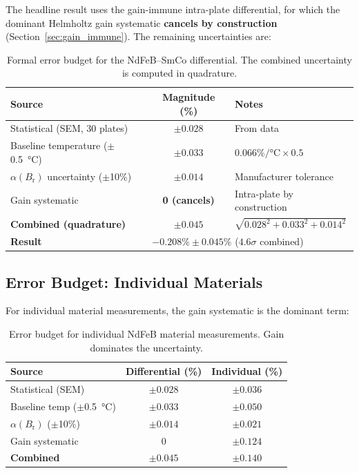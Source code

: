 \documentclass[11pt,letterpaper]{article}
\newcommand{\Br}{B_\mathrm{r}}
\newcommand{\alphar}{\alpha(\Br)}
\begin{document}
The headline result uses the gain-immune intra-plate differential, for which
the dominant Helmholtz gain systematic \textbf{cancels by construction}
(Section~\ref{sec:gain_immune}). The remaining uncertainties are:

\begin{table}[H]
\centering
\caption{Formal error budget for the NdFeB--SmCo differential. The combined
uncertainty is computed in quadrature.}
\label{tab:error_budget}
\begin{tabular}{@{}lcl@{}}
\toprule
\textbf{Source} & \textbf{Magnitude (\%)} & \textbf{Notes} \\
\midrule
Statistical (SEM, 30 plates) & $\pm 0.028$ & From data \\
Baseline temperature ($\pm$\SI{0.5}{\celsius}) & $\pm 0.033$ & $0.066\%/\si{\celsius} \times 0.5$ \\
$\alphar$ uncertainty ($\pm$10\%) & $\pm 0.014$ & Manufacturer tolerance \\
Gain systematic & \textbf{0 (cancels)} & Intra-plate by construction \\
\midrule
\textbf{Combined (quadrature)} & $\pm 0.045$ & $\sqrt{0.028^2 + 0.033^2 + 0.014^2}$ \\
\midrule\midrule
\textbf{Result} & \multicolumn{2}{l}{$\mathbf{-0.208\% \pm 0.045\%}$ ($4.6\sigma$ combined)} \\
\bottomrule
\end{tabular}
\end{table}

\subsection{Error Budget: Individual Materials}

For individual material measurements, the gain systematic is the dominant term:

\begin{table}[H]
\centering
\caption{Error budget for individual NdFeB material measurements. Gain
dominates the uncertainty.}
\label{tab:error_budget_individual}
\begin{tabular}{@{}lcc@{}}
\toprule
\textbf{Source} & \textbf{Differential (\%)} & \textbf{Individual (\%)} \\
\midrule
Statistical (SEM) & $\pm 0.028$ & $\pm 0.036$ \\
Baseline temp ($\pm$\SI{0.5}{\celsius}) & $\pm 0.033$ & $\pm 0.050$ \\
$\alphar$ ($\pm$10\%) & $\pm 0.014$ & $\pm 0.021$ \\
Gain systematic & $0$ & $\pm 0.124$ \\
\midrule
\textbf{Combined} & $\pm 0.045$ & $\pm 0.140$ \\
\bottomrule
\end{tabular}
\end{table}
\end{document}
